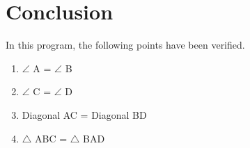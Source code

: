 \documentclass[journal,10pt,twocolumn]{article}
\begin{document}
\section{Conclusion}
\begin{flushleft}
In this program, the following points have been verified.\\
\vspace{0.1cm}
\begin{enumerate}
    \item $\angle$ A = $\angle$ B\\
    \item $\angle$ C = $\angle$ D\\
    \item Diagonal AC = Diagonal BD\\
    \item $\triangle$ ABC  = $\triangle$ BAD \\
\end{enumerate}
\end{flushleft}
\end{document}
